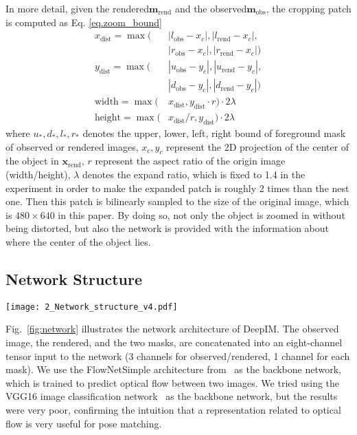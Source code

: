 \documentclass[twocolumn]{svjour3}
\newcommand{\dimnet}[0]{DeepIM}
\newcommand{\xrend}[0]{\mathbf{x}_{\text{rend}}}
\newcommand{\mreal}[0]{\mathbf{m}_{\text{obs}}}
\newcommand{\mrend}[0]{\mathbf{m}_{\text{rend}}}
\newcommand{\rend}[0]{rendered}
\newcommand{\real}[0]{observed}
\begin{document}
In more detail, given the \rend\mask $\mrend$ and the \real\mask $\mreal$, the cropping patch is computed as Eq. \ref{eq.zoom_bound}
\begin{equation}
\begin{split}
x_{\text{dist}} = \max(&|l_{\text{obs}}-x_{c}|, |l_{\text{rend}}-x_{c}|,\\
			  &|r_{\text{obs}}-x_{c}|, |r_{\text{rend}}-x_{c}|)\\
y_{\text{dist}} = \max(&|u_{\text{obs}}-y_{c}|, |u_{\text{rend}}-y_{c}|,\\
			  &|d_{\text{obs}}-y_{c}|, |d_{\text{rend}}-y_{c}|)\\
\text{width} = \max(&x_{\text{dist}}, y_{\text{dist}} \cdot r) \cdot 2\lambda\\
\text{height} = \max(&x_{\text{dist}} / r, y_{\text{dist}}) \cdot 2\lambda
\end{split}
\label{eq.zoom_bound}
\end{equation}
where $u_{*}, d_{*}, l_{*}, r_{*}$ denotes the upper, lower, left, right bound of foreground mask of observed or rendered images, $x_{c}, y_{c}$ represent the 2D projection of the center of the object in $\xrend$, $r$ represent the aspect ratio of the origin image (width/height), $\lambda$ denotes the expand ratio, which is fixed to 1.4 in the experiment in order to make the expanded patch is roughly 2 times than the nest one. Then this patch is bilinearly sampled to the size of the original image, which is $480 \times 640$ in this paper. By doing so, not only the object is zoomed in without being distorted, but also the network is provided with the information about where the center of the object lies.

\subsection{Network Structure}
\label{sec.network_structure}
\begin{figure*}[t]
	\centering
	\texttt{[image: 2\_Network\_structure\_v4.pdf]}
	\caption{{\dimnet\ uses a FlowNetSimple backbone to predict a relative SE(3) transformation to match the observed and \rend\ image of an object.}}
	\label{fig:network}
    
\end{figure*}

Fig.~\ref{fig:network} illustrates the network architecture of \dimnet. 
The observed image, the \rend\image, and the two masks, are concatenated into an eight-channel tensor input to the network (3 channels for \real/\rend\image, 1 channel for each mask). 
We use the FlowNetSimple architecture from~\cite{dosovitskiy2015flownet} as the backbone network, which is trained to predict optical flow between two images.
We tried using the VGG16 image classification network~\citep{simonyan2014very} as the backbone network, but the results were very poor, confirming the intuition that a representation related to optical flow is very useful for pose matching.
\end{document}
